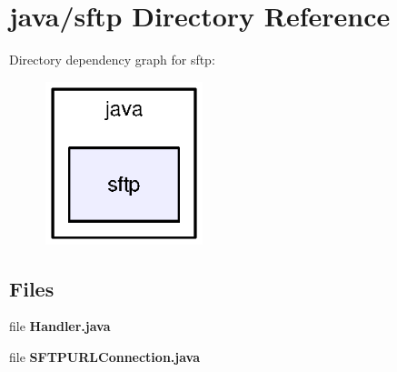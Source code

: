 \section{java/sftp Directory Reference}
\label{dir_1fc2918f839e083ad693d50cbc884b82}
Directory dependency graph for sftp\+:\nopagebreak
\begin{figure}[H]
\begin{center}
\leavevmode
\includegraphics[width=130pt]{dir_1fc2918f839e083ad693d50cbc884b82_dep}
\end{center}
\end{figure}
\subsection*{Files}
\begin{DoxyCompactItemize}
\item 
file {\bf Handler.\+java}
\item 
file {\bf S\+F\+T\+P\+U\+R\+L\+Connection.\+java}
\end{DoxyCompactItemize}
